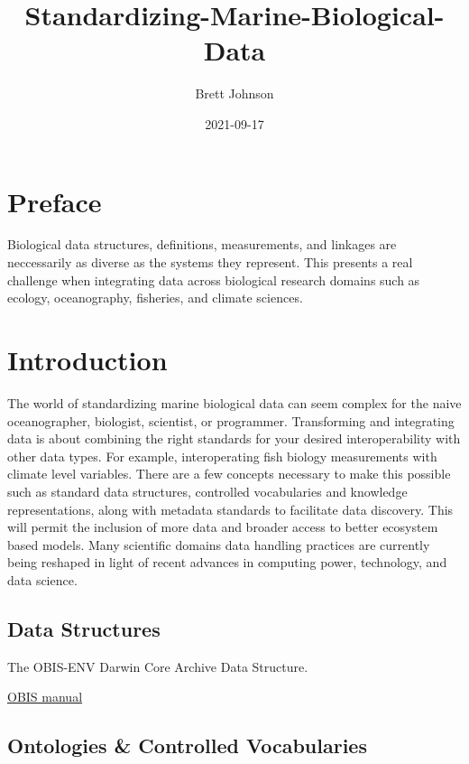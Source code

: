 \documentclass[
]{book}
\title{Standardizing-Marine-Biological-Data}
\author{Brett Johnson}
\date{2021-09-17}
\begin{document}
\maketitle

{
\setcounter{tocdepth}{1}
\tableofcontents
}
\hypertarget{preface}{%
\chapter{Preface}\label{preface}}

Biological data structures, definitions, measurements, and linkages are neccessarily as diverse as the systems they represent. This presents a real challenge when integrating data across biological research domains such as ecology, oceanography, fisheries, and climate sciences.

\hypertarget{intro}{%
\chapter{Introduction}\label{intro}}

The world of standardizing marine biological data can seem complex for the naive oceanographer, biologist, scientist, or programmer.
Transforming and integrating data is about combining the right standards for your desired interoperability with other data types.
For example, interoperating fish biology measurements with climate level variables.
There are a few concepts necessary to make this possible such as standard data structures, controlled vocabularies and knowledge representations, along with metadata standards to facilitate data discovery. This will permit the inclusion of more data and broader access to better ecosystem based models. Many scientific domains data handling practices are currently being reshaped in light of recent advances in computing power, technology, and data science.

\hypertarget{data-structures}{%
\section{Data Structures}\label{data-structures}}

The OBIS-ENV Darwin Core Archive Data Structure.

\href{https://obis.org/manual/}{OBIS manual}

\hypertarget{ontologies-controlled-vocabularies}{%
\section{Ontologies \& Controlled Vocabularies}\label{ontologies-controlled-vocabularies}}
\end{document}
